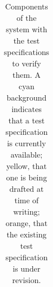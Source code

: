 \begin{longtable}{p{}|p{}|p{}}
\caption{Components of the \product{} system with the test specifications to verify them.
A cyan background indicates that a test specification is currently available; yellow, that one is being drafted at time of writing; orange, 
that the existing test specification is under revision. }
\label{tab:testspecs}

\end{longtable}
